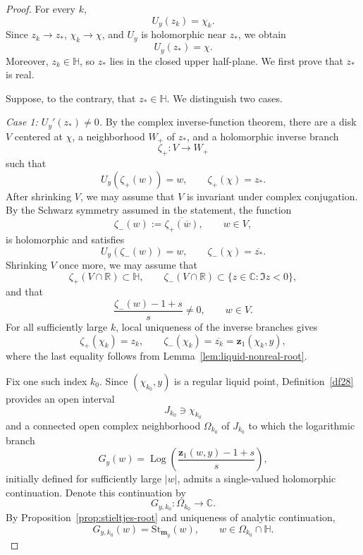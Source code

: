 \documentclass[10pt,a4paper]{amsart}
\begin{document}
\begin{proof}
For every \(k\),
\[
    U_y(z_k)=\chi_k.
\]
Since \(z_k\to z_*\), \(\chi_k\to\chi\), and \(U_y\) is holomorphic near
\(z_*\), we obtain
\[
    U_y(z_*)=\chi.
\]
Moreover, \(z_k\in\mathbb H\), so \(z_*\) lies in the closed upper
half-plane. We first prove that \(z_*\) is real.

Suppose, to the contrary, that \(z_*\in\mathbb H\). We distinguish two
cases.

\medskip
\noindent\emph{Case 1: \(U_y'(z_*)\neq0\).}
By the complex inverse-function theorem, there are a disk \(V\) centered at
\(\chi\), a neighborhood \(W_+\) of \(z_*\), and a holomorphic inverse branch
\[
    \zeta_+:V\longrightarrow W_+
\]
such that
\[
    U_y(\zeta_+(w))=w,
    \qquad
    \zeta_+(\chi)=z_*.
\]
After shrinking \(V\), we may assume that \(V\) is invariant under complex
conjugation. By the Schwarz symmetry assumed in the statement, the function
\[
    \zeta_-(w):=\overline{\zeta_+(\overline w)},
    \qquad w\in V,
\]
is holomorphic and satisfies
\[
    U_y(\zeta_-(w))=w,
    \qquad
    \zeta_-(\chi)=\overline{z_*}.
\]
Shrinking \(V\) once more, we may assume that
\[
    \zeta_+(V\cap\mathbb R)\subset\mathbb H,
    \qquad
    \zeta_-(V\cap\mathbb R)
    \subset\{z\in\mathbb C:\Im z<0\},
\]
and that
\[
    \frac{\zeta_-(w)-1+s}{s}\neq0,
    \qquad w\in V.
\]
For all sufficiently large \(k\), local uniqueness of the inverse branches
gives
\[
    \zeta_+(\chi_k)=z_k,
    \qquad
    \zeta_-(\chi_k)=\overline{z_k}
    =\mathbf z_1(\chi_k,y),
\]
where the last equality follows from
Lemma~\ref{lem:liquid-nonreal-root}.

Fix one such index \(k_0\). Since \((\chi_{k_0},y)\) is a regular liquid
point, Definition~\ref{df28} provides an open interval
\[
    J_{k_0}\ni\chi_{k_0}
\]
and a connected open complex neighborhood \(\Omega_{k_0}\) of \(J_{k_0}\)
to which the logarithmic branch
\[
    G_y(w)
    =
    \operatorname{Log}\!\left(
        \frac{\mathbf z_1(w,y)-1+s}{s}
    \right),
\]
initially defined for sufficiently large \(\lvert w\rvert\), admits a
single-valued holomorphic continuation. Denote this continuation by
\[
    G_{y,k_0}:\Omega_{k_0}\longrightarrow\mathbb C.
\]
By Proposition~\ref{prop:stieltjes-root} and uniqueness of analytic
continuation,
\[
    G_{y,k_0}(w)=\mathrm{St}_{\mathbf m_y}(w),
    \qquad w\in\Omega_{k_0}\cap\mathbb H.
\]


\end{proof}
\end{document}

